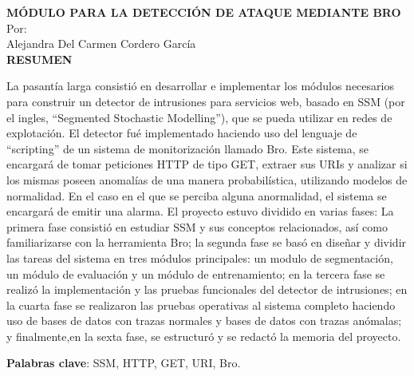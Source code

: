 \setcounter{page}{5}
\begin{center}

{\bfseries MÓDULO PARA LA DETECCIÓN DE
ATAQUE MEDIANTE BRO\\}
\bigskip
Por: \\ Alejandra Del Carmen Cordero García\\
\bigskip
\bigskip
{\bf RESUMEN}  %
\end{center}	

La pasantía larga consistió en desarrollar e implementar los
módulos necesarios para construir un detector de intrusiones para servicios
web, basado en SSM (por el ingles, ``Segmented Stochastic Modelling''),
que se pueda utilizar en redes de explotación. El detector fué implementado
haciendo uso del lenguaje de ``scripting'' de un sistema de monitorización
llamado Bro. Este sistema, se encargará de tomar peticiones HTTP de tipo
GET, extraer sus URIs y analizar si los mismas poseen anomalías de una
manera probabilística, utilizando modelos de normalidad. En el caso en el
que se perciba alguna anormalidad, el sistema se encargará de emitir una
alarma.
El proyecto estuvo dividido en varias fases: La primera fase consistió en
estudiar SSM y sus conceptos relacionados, así como familiarizarse con la
herramienta Bro; la segunda fase se basó en diseñar y dividir las tareas del
sistema en tres módulos principales: un modulo de segmentación, un módulo
de evaluación y un módulo de entrenamiento; en la tercera fase se realizó la
implementación y las pruebas funcionales del detector de intrusiones; en la
cuarta fase se realizaron las pruebas operativas al sistema completo haciendo
uso de bases de datos con trazas normales y bases de datos con trazas
anómalas; y finalmente,en la sexta fase, se estructuró y se redactó la memoria
del proyecto.

\vfill
\textbf{Palabras clave}: SSM, HTTP, GET, URI, Bro.
 